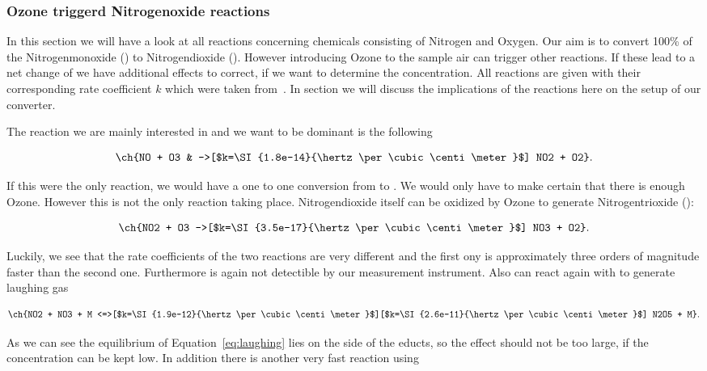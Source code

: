 \subsubsection{Ozone triggerd Nitrogenoxide reactions}
\label{sec:o-no}

In this section we will have a look at all reactions concerning
chemicals consisting of Nitrogen and Oxygen. Our aim is to convert
100\% of the Nitrogenmonoxide () to Nitrogendioxide
(). However introducing Ozone to the sample air can trigger
other reactions. If these lead to a net change of  we have
additional effects to correct, if we want to determine the 
concentration. All reactions are given with their corresponding rate
coefficient $k$ which were taken from~\cite{bsc}. In section
 we will discuss the implications of the reactions
here on the setup of our converter.

The reaction we are mainly interested in and we want to be dominant is
the following

\begin{align*}
  \ch{NO + O3 & ->[$k=\SI{1.8e-14}{\hertz\per\cubic\centi\meter}$] NO2 + O2}.
\end{align*}

If this were the only reaction, we would have a one to one conversion
from  to . We would only have to make certain that
there is enough Ozone. However this is not the only reaction taking
place. Nitrogendioxide itself can be oxidized by Ozone to generate
Nitrogentrioxide ():

\begin{align*}
  \ch{NO2 + O3 ->[$k=\SI{3.5e-17}{\hertz\per\cubic\centi\meter}$] NO3 + O2}.
\end{align*}

Luckily, we see that the rate coefficients of the two reactions are
very different and the first ony is approximately three orders of
magnitude faster than the second one. Furthermore  is again
not detectible by our measurement instrument. Also  can react
again with  to generate laughing gas

\begin{align}
  \ch{NO2 + NO3 + M
  <=>[$k=\SI{1.9e-12}{\hertz\per\cubic\centi\meter}$][$k=\SI{2.6e-11}{\hertz\per\cubic\centi\meter}$]
  N2O5 + M}. \label{eq:laughing}
\end{align}

As we can see the equilibrium of Equation~\eqref{eq:laughing} lies on the
side of the educts, so the effect should not be too large, if the
 concentration can be kept low. In addition there is another
very fast reaction using 

